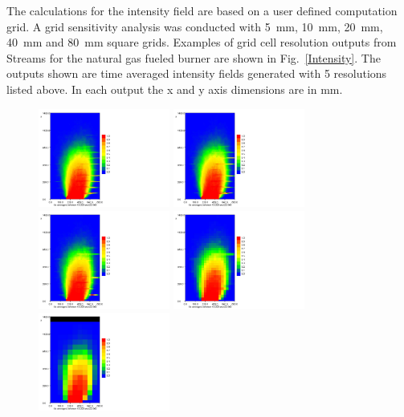 \documentclass[twoside]{uocthesis}
\begin{document}
{{The calculations for the intensity field are based on a user defined computation grid.  A grid sensitivity analysis was conducted with 5~mm, 10~mm, 20~mm, 40~mm and 80~mm square grids.  Examples of grid cell resolution outputs from Streams for the natural gas fueled burner are shown in Fig.~\ref{Intensity}.  The outputs shown are time averaged intensity fields generated with 5 resolutions listed above. In each output the x and y axis dimensions are in mm.

\begin{figure}[p]
	\centering
	\includegraphics[trim=0in 0in 3.5in 0in,clip=true,width=1.7in]{../Figures/FHNG80-1_GS_5mm_10s_color}
	\includegraphics[trim=0in 0in 3.5in 0in,clip=true,width=1.7in]{../Figures/FHNG80-1_GS_10mm_10s_color}\\
	\includegraphics[trim=0in 0in 3.5in 0in,clip=true,width=1.7in]{../Figures/FHNG80-1_GS_20mm_10s_color}
	\includegraphics[trim=0in 0in 3.5in 0in,clip=true,width=1.7in]{../Figures/FHNG80-1_GS_40mm_10s_color}
	\includegraphics[trim=0in 0in 3.5in 0in,clip=true,width=1.7in]{../Figures/FHNG80-1_GS_80mm_10s_color}\\

\end{figure}}}
\end{document}
